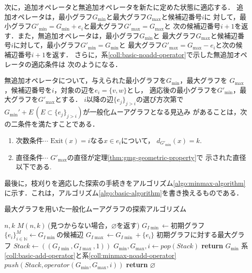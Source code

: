 次に，追加オペレータと無追加オペレータを新たに定めた状態に適応する．
追加オペレータは，最小グラフ$G_{\min}$と最大グラフ$G_{\max}$と候補辺番号$i$に
対して，最小グラフ$G'_{\min}=G_{\min}+e_i$と最大グラフ$G'_{\max}=G_{\max}$と
次の候補辺番号$i+1$を返す．また，無追加オペレータは，最小グラフ$G_{\min}$と
最大グラフ$G_{\max}$と候補辺番号$i$に対して，最小グラフ$G'_{\min}=G_{\min}$と
最大グラフ$G'_{\max}=G_{\max}-e_i$と次の候補辺番号$i+1$を返す．
さらに，系\ref{coll:basic-noadd-operator}で示した無追加オペレータの適応条件は
次のようになる．
\begin{collary-without-proof}
  \label{coll:minmax-noadd-operator}
  無追加オペレータについて，与えられた最小グラフを$G_{\min}$，最大グラフを
  $G_{\max}$，候補辺番号を$i$，対象の辺を$e_i=\{v,w\}$とし，
  適応後の最小グラフを$G'_{\min}$，最大グラフを$G'_{\max}$とする．
  $i$以降の辺$\{e_j\}_{j>i}$の選び方次第で
  $G_{\min}'+E\,(E\subset \{e_j\}_{j>i})$が一般化ムーアグラフとなる見込み
  があることは，次の二条件を満たすことである．
  \begin{enumerate}
  \item 次数条件$\cdots$ $\text{Exit}(x)=i$なる$x\in e_i$について，
    $d_{G'_{\min}}(x)=k$.
  \item 直径条件$\cdots$ $G'_{\max}$の直径が定理\ref{thm:gmg-geometric-property}で
    示された直径以下である.
  \end{enumerate}
\end{collary-without-proof}

最後に，枝刈りを適応した探索の手続きをアルゴリズム\ref{algo:minmax-algorithm}
に示す．これは，アルゴリズム\ref{algo:basic-algorithm}を書き換えるものである．
\begin{algorithm}[H]
  \caption{最大グラフを用いた一般化ムーアグラフの探索アルゴリズム}
  \label{algo:minmax-algorithm}
  \begin{algorithmic}[1]
    \Require $n,k$
    \Ensure $M(n,k)\:$(見つからない場合，$\varnothing$を返す)
    \State $G_{I\min}\gets\text{初期グラフ}$
    \State $\{e_i\}_{i\in\mathbb{N}}^M\gets G_{I\min}\text{の候補辺}$
    \State $G_{I\max}\gets G_{I\min}+\{e_i\}$
    \Comment 初期グラフに対する最大グラフ
    \State $Stack\gets((G_{I\min},G_{I\max},1))$
    \State $G_{\min},G_{\max},i\gets pop(Stack)$
    \State \textbf{return} $G_{\min}$
    \EndIf
    \Comment 系\ref{coll:basic-add-operator}と系\ref{coll:minmax-noadd-operator}
    \State $push(Stack,operator(G_{\min},G_{\max},i))$
    \EndIf
    \EndFor
    \EndWhile
    \State \textbf{return} $\varnothing$
    \EndProcedure
  \end{algorithmic}
\end{algorithm}

